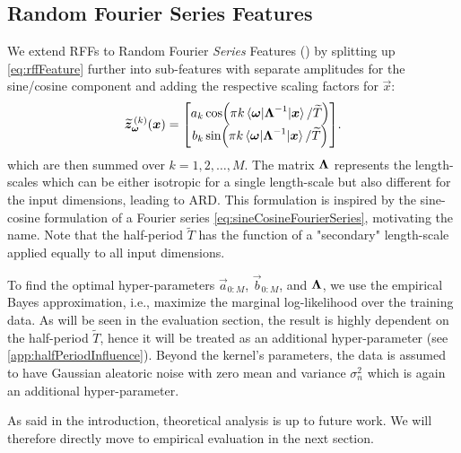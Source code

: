 \subsection{Random Fourier Series Features}
	We extend \acp{RFF} to Random Fourier \emph{Series} Features () by splitting up \cref{eq:rffFeature} further into sub-features with separate amplitudes for the sine/cosine component and adding the respective scaling factors for $\vec{x}$:
	\begin{equation}
		\widetilde{\bm{z}}_{\bm{\omega}}^{\,(k)}(\bm{x}) =
			\begin{bmatrix}
				a_k \cos(\pi k \mel{\bm{\omega}}{\bm{\mathrm{\Lambda}}^{-1}}{\bm{x}} / \widetilde{T}) \\
				b_k \sin(\pi k \mel{\bm{\omega}}{\bm{\mathrm{\Lambda}}^{-1}}{\bm{x}} / \widetilde{T})
			\end{bmatrix}\!.
		\label{eq:rfsf}
	\end{equation}
	which are then summed over $k = 1, 2, \dots, M$.
	The matrix $\bm{\mathrm{\Lambda}}$ represents the length-scales which can be either isotropic for a single length-scale but also different for the input dimensions, leading to \ac{ARD}.
	This formulation is inspired by the sine-cosine formulation of a Fourier series \cref{eq:sineCosineFourierSeries}, motivating the name.
	Note that the half-period $\tilde{T}$ has the function of a "secondary" length-scale applied equally to all input dimensions.

	To find the optimal hyper-parameters $\vec{a}_{0:M}$, $\vec{b}_{0:M}$, and $\bm{\mathrm{\Lambda}}$, we use the empirical Bayes approximation\cite[p.\,165]{bishopPatternRecognitionMachine2006}, i.e., maximize the marginal log-likelihood over the training data.
	As will be seen in the evaluation section, the result is highly dependent on the half-period $\tilde{T}$, hence it will be treated as an additional hyper-parameter (see \cref{app:halfPeriodInfluence}).
	Beyond the kernel's parameters, the data is assumed to have Gaussian aleatoric noise with zero mean and variance $\sigma_n^2$ which is again an additional hyper-parameter.

	As said in the introduction, theoretical analysis is up to future work.
	We will therefore directly move to empirical evaluation in the next section.


